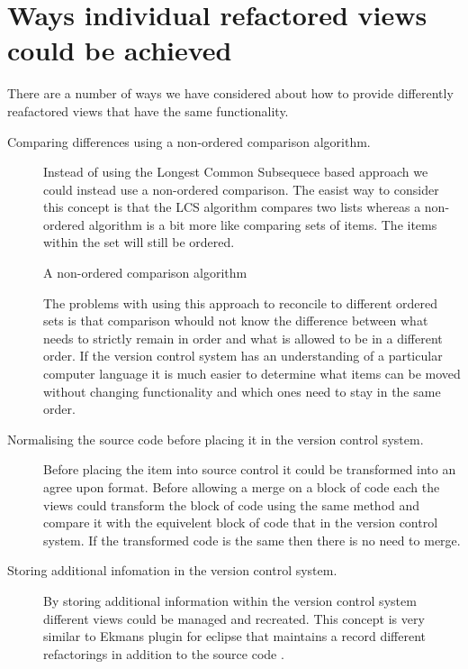 \section{Ways individual refactored views could be achieved}
There are a number of ways we have considered about how to provide differently reafactored views that have the same functionality.

\begin{description}
  \item [Comparing differences using a non-ordered comparison algorithm.]   
    Instead of using the Longest Common Subsequece based approach we could instead use a non-ordered comparison.  The easist way to consider this concept is that the LCS algorithm compares two lists whereas a non-ordered algorithm is a bit more like comparing sets of items. The items within the set will still be ordered.

    \begin{algorithm}[H]
    \SetAlgoLined
    \caption{A non-ordered comparison algorithm}
    \end{algorithm}


    The problems with using this approach to reconcile to different ordered sets is that comparison whould not know the difference between what needs to strictly remain in order and what is allowed to be in a different order. If the version control system has an understanding of a particular computer language it is much easier to determine what items can be moved without changing functionality and which ones need to stay in the same order. 
  \item [Normalising the source code before placing it in the version control system.]
    Before placing the item into source control it could be transformed into an agree upon format. Before allowing a merge on a block of code each the views could transform the block of code using the same method and compare it with the equivelent block of code that in the version control system. If the transformed code is the same then there is no need to merge.
  \item [Storing additional infomation in the version control system.]
    By storing additional information within the version control system different views could be managed and recreated.
    This concept is very similar to Ekmans plugin for eclipse that maintains a record different refactorings in addition to the source code \cite{Ekman2004}.


\end{description}
